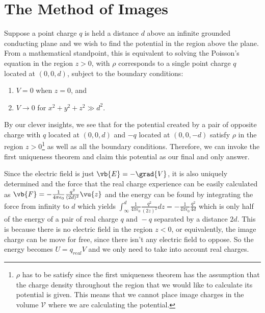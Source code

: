 \documentclass[a4paper,12pt]{report}
\begin{document}
	
	
	
	\section{The Method of Images}
	
	Suppose a point charge \(q\) is held a distance \(d\) above an infinite grounded conducting plane and we wish to find the potential in the region above the plane. From a mathematical standpoint, this is equivalent to solving the Poisson's equation in the region \(z > 0\), with \(\rho \) corresponds to a single point charge  \(q\) located at \((0,0,d )\), subject to the boundary conditions: 
	\begin{enumerate}
		\item \(V = 0\) when \(z = 0\), and
		\item \(V \rightarrow 0\) for \(x^2 + y^2 + z^2 \gg d^2\).	
	\end{enumerate}
	
	By our clever insights, we see that for the potential created by a pair of opposite charge with \(q\) located at \((0,0,d)\) and \(-q\) located at \((0,0,-d)\) satisfy \(\rho \) in the region \(z > 0\)\footnote{\(\rho \) has to be satisfy since the first uniqueness theorem has the assumption that the charge density throughout the region that we would like to calculate its potential is given. This means that we cannot place image charges in the volume \(\mathcal{V} \) where we are calculating the potential.} as well as all the boundary conditions. Therefore, we can invoke the first uniqueness theorem and claim this potential as our final and only answer.
	
	Since the electric field is just \(\vb{E} = -\grad{V} \), it is also uniquely determined and the force that the real charge experience can be easily calculated as \(\vb{F} = -\frac{1}{4\pi\epsilon_0} \frac{q^2}{(2d)^2} \vu{z}  \) and the energy can be found by integrating the force from infinity to \(d\) which yields \(\int_{\infty}^{d} \frac{1}{4\pi\epsilon_0} \frac{q^2}{(2z)^2} dz = -\frac{1}{4\pi\epsilon_0} \frac{q^2}{4d}  \) which is only half of the energy of a pair of real charge \(q \text{ and }  -q\) separated by a distance \(2d\). This is because there is no electric field in the region \(z < 0\), or equivalently, the image charge can be move for free, since there isn't any electric field to oppose. So the energy becomes \(U = q_{real} V \) and we only need to take into account real charges. 
	
\end{document}
